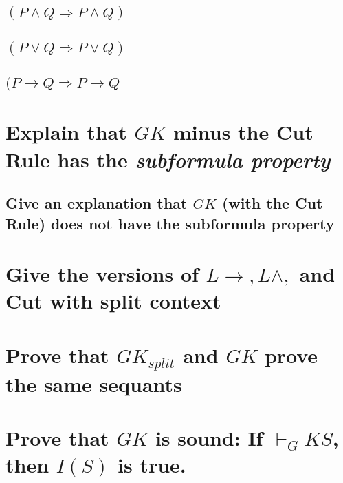 \documentclass{article}
\begin{document}
\subsection{$(P\wedge Q \Rightarrow P \wedge Q)$}
\subsection{$(P\vee Q \Rightarrow P \vee Q)$}
\subsection{$(P \to Q \Rightarrow P \to Q$}
\section{Explain that $GK$ minus the Cut Rule has the \emph{subformula property}}
\subsection{Give an explanation that $GK$ (with the Cut Rule) does not have
the subformula property}
\section{Give the versions of $L \to, L\wedge,$ and Cut with split context}
\section{Prove that $GK_{split}$ and $GK$ prove the same sequants}
\section{Prove that $GK$ is sound: If $\vdash_GK S$, then $I(S)$ is true.}
\end{document}
